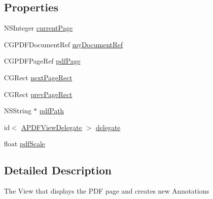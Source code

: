 \subsection*{Properties}
\begin{DoxyCompactItemize}
\item 
N\-S\-Integer \hyperlink{interface_a_p_d_f_view_a0b65e4af25d04f030c8d56e5bc9420ba}{current\-Page}
\item 
C\-G\-P\-D\-F\-Document\-Ref \hyperlink{interface_a_p_d_f_view_abfd40cc20df359fde8d000a80c2b07b1}{my\-Document\-Ref}
\item 
C\-G\-P\-D\-F\-Page\-Ref \hyperlink{interface_a_p_d_f_view_a212b6e8af54a7ff05d615a21e6ebc060}{pdf\-Page}
\item 
C\-G\-Rect \hyperlink{interface_a_p_d_f_view_a00c74386673969efcb36e654be9ab04e}{next\-Page\-Rect}
\item 
C\-G\-Rect \hyperlink{interface_a_p_d_f_view_a6b63fc09909583cc1b39cb80c739caa5}{prev\-Page\-Rect}
\item 
N\-S\-String $\ast$ \hyperlink{interface_a_p_d_f_view_acc47c24f2e2edd6fc251380ab4ac41b2}{pdf\-Path}
\item 
id$<$ \hyperlink{protocol_a_p_d_f_view_delegate-p}{A\-P\-D\-F\-View\-Delegate} $>$ \hyperlink{interface_a_p_d_f_view_ad971242eaf334f887a4346d92f1587d9}{delegate}
\item 
float \hyperlink{interface_a_p_d_f_view_a17160b472ff2e9a7d4cbbd30f5db22c5}{pdf\-Scale}
\end{DoxyCompactItemize}


\subsection{Detailed Description}
The View that displays the P\-D\-F page and creates new Annotations 


